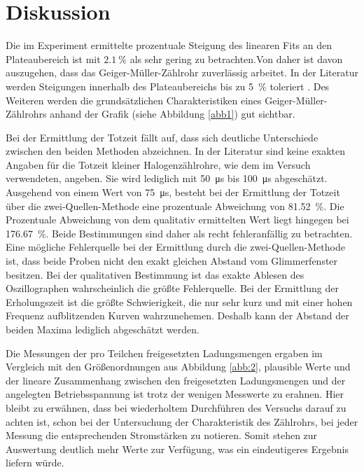\section{Diskussion}

Die im Experiment ermittelte prozentuale Steigung des linearen Fits an den Plateaubereich ist mit $\SI{2,1}{\percent}$ als sehr gering zu betrachten.Von daher
ist davon auszugehen, dass das Geiger-Müller-Zählrohr zuverlässig arbeitet. In der Literatur werden Steigungen innerhalb des Plateaubereichs bis
zu \SI{5}{\percent} toleriert \cite{Q2}.
Des Weiteren werden die grundsätzlichen Charakteristiken eines Geiger-Müller-Zählrohrs anhand der Grafik (siehe Abbildung \ref{abb1}) gut sichtbar.

\noindent Bei der Ermittlung der Totzeit fällt auf, dass sich deutliche Unterschiede zwischen den beiden Methoden abzeichnen.
In der Literatur \cite{Q2} sind keine exakten Angaben für die Totzeit kleiner Halogenzählrohre, wie dem im Versuch verwendeten, angeben.
Sie wird lediglich mit \SI{50}{\micro \second} bis \SI{100}{\micro \second} abgeschätzt.
Ausgehend von einem Wert von \SI{75}{\micro \second}, besteht bei der Ermittlung der Totzeit über die
zwei-Quellen-Methode eine prozentuale Abweichung von \SI{81,52}{\percent}. Die Prozentuale Abweichung von dem qualitativ ermittelten Wert
liegt hingegen bei \SI{176,67}{\percent}. Beide Bestimmungen sind daher als recht fehleranfällig zu betrachten.
Eine mögliche Fehlerquelle bei der Ermittlung durch die zwei-Quellen-Methode ist, dass beide Proben nicht den exakt gleichen Abstand vom
Glimmerfenster besitzen. Bei der qualitativen Bestimmung ist das exakte Ablesen des Oszillographen wahrscheinlich die größte Fehlerquelle.
Bei der Ermittlung der Erholungszeit ist die größte Schwierigkeit, die nur sehr kurz und mit einer hohen Frequenz aufblitzenden Kurven
wahrzunehemen. Deshalb kann der Abstand der beiden Maxima lediglich abgeschätzt werden.

\noindent Die Messungen der pro Teilchen freigesetzten Ladungsmengen ergaben im Vergleich mit den Größenordnungen aus Abbildung \ref{abb:2},
plausible Werte und der lineare Zusammenhang zwischen den freigesetzten
Ladungsmengen und der angelegten Betriebsspannung ist trotz der wenigen Messwerte zu erahnen.
Hier bleibt zu erwähnen, dass bei wiederholtem Durchführen des Versuchs darauf zu achten ist, schon bei der Untersuchung der Charakteristik
des Zählrohrs, bei jeder Messung die entsprechenden Stromstärken zu notieren. Somit stehen zur Auswertung deutlich mehr Werte zur Verfügung,
was ein eindeutigeres Ergebnis liefern würde.



\newpage
\nocite{*}
\printbibliography
